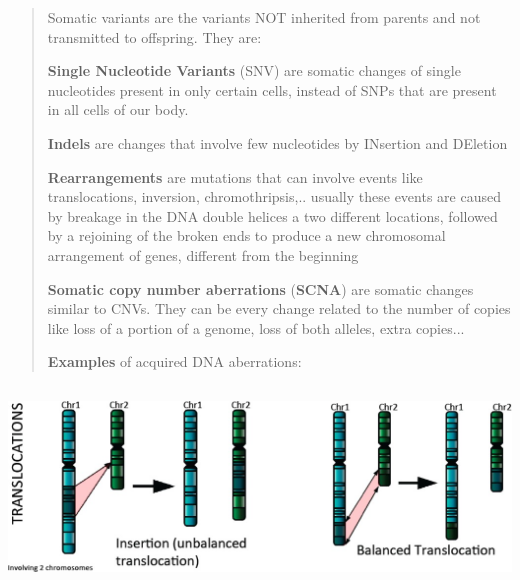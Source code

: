 \begin{quote}
Somatic variants are the variants NOT inherited from parents and not
transmitted to offspring. They are:

\textbf{Single Nucleotide Variants} (SNV) are somatic changes of single
nucleotides present in only certain cells, instead of SNPs that are
present in all cells of our body.

\textbf{Indels} are changes that involve few nucleotides by INsertion
and DEletion

\textbf{Rearrangements} are mutations that can involve events like
translocations, inversion, chromothripsis,.. usually these events are
caused by breakage in the DNA double helices a two different locations,
followed by a rejoining of the broken ends to produce a new chromosomal
arrangement of genes, different from the beginning

\textbf{Somatic copy number aberrations} (\textbf{SCNA}) are somatic
changes similar to CNVs. They can be every change related to the number
of copies like loss of a portion of a genome, loss of both alleles,
extra copies...

\textbf{Examples} of acquired DNA aberrations:
\end{quote}

\includegraphics[width=6.1748in,height=2.09646in]{image6.jpeg}

